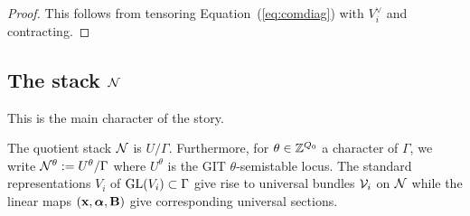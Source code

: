 \documentclass{amsart}
\newcommand{\balpha}{\boldsymbol{\alpha}}
\theoremstyle{definition}
\begin{document}
\begin{proof}
This follows from tensoring Equation~(\ref{eq:comdiag}) with $V_i^\vee$ and contracting.
\end{proof}





\subsection{The stack $\mathcal{N}$}
This is the main character of the story.

\begin{definition}
The quotient stack $\mathcal{N}$ is $U/\Gamma$.
Furthermore, for $\theta \in \mathbb{Z}^{Q_0}$ a character of $\Gamma$, we write $\mathcal{N}^\theta:= U^\theta/\Gamma$ where $U^\theta$ is the GIT $\theta$-semistable locus.
The standard representations $V_i$ of $\operatorname{GL}(V_i) \subset \Gamma$ give rise to universal bundles $\mathcal{V}_i$ on $\mathcal{N}$ while the linear maps $(\bfx, \balpha, \bfB)$ give corresponding universal sections.
\end{definition}
\end{document}
